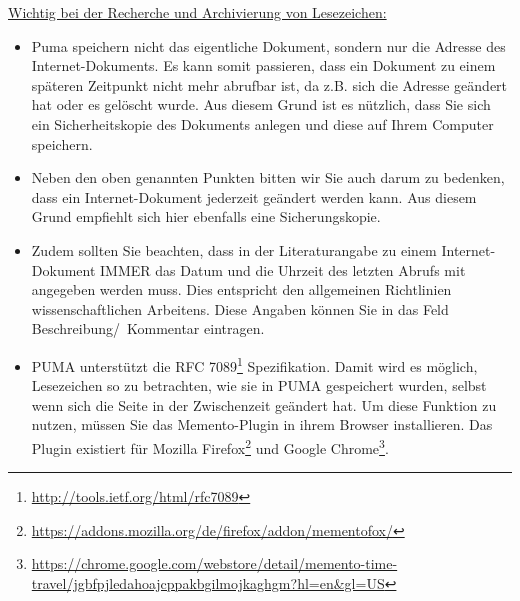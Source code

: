 \underline{Wichtig bei der Recherche und Archivierung von Lesezeichen:}
\begin{itemize}
    \item Puma speichern nicht das eigentliche Dokument, sondern nur die Adresse des Internet-Dokuments. Es kann somit passieren, dass ein Dokument zu einem späteren Zeitpunkt nicht mehr abrufbar ist, da z.B. sich die Adresse geändert hat oder es gelöscht wurde.  Aus diesem Grund ist es nützlich, dass Sie sich ein Sicherheitskopie des Dokuments anlegen und diese auf Ihrem Computer speichern.
    \item Neben den oben genannten Punkten bitten wir Sie auch darum zu bedenken, dass ein Internet-Dokument jederzeit geändert werden kann. Aus diesem Grund empfiehlt sich hier ebenfalls eine Sicherungskopie. 
    \item Zudem sollten Sie beachten, dass in der Literaturangabe zu einem Internet-Dokument IMMER das Datum und die Uhrzeit des letzten Abrufs mit angegeben werden muss. Dies entspricht den allgemeinen Richtlinien wissenschaftlichen Arbeitens. Diese Angaben können Sie in das Feld Beschreibung/~Kommentar eintragen.
    \item PUMA unterstützt die RFC 7089\footnote{\url{http://tools.ietf.org/html/rfc7089}} Spezifikation. Damit wird es möglich, Lesezeichen so zu betrachten, wie sie in PUMA gespeichert wurden, selbst wenn sich die Seite in der Zwischenzeit geändert hat. Um diese Funktion zu nutzen, müssen Sie das Memento-Plugin in ihrem Browser installieren. Das Plugin existiert für Mozilla Firefox\footnote{\url{https://addons.mozilla.org/de/firefox/addon/mementofox/}} und Google Chrome\footnote{\url{https://chrome.google.com/webstore/detail/memento-time-travel/jgbfpjledahoajcppakbgilmojkaghgm?hl=en&gl=US}}. 
\end{itemize}
